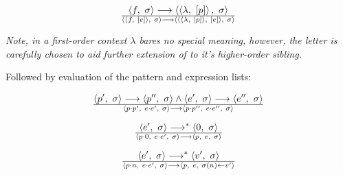 \begin{equation}
{
\left\langle f,\ \sigma\right\rangle
\longrightarrow
\left\langle \left\langle \lambda,\ [p]\right\rangle,\ \sigma\right\rangle
}\over{
\left\langle \left\langle f,\ [e]\right\rangle,\ \sigma\right\rangle
\longrightarrow
\left\langle
\left\langle\left\langle \lambda,\ [p]\right\rangle,\ [e]\right\rangle
,\ \sigma\right\rangle
}
\end{equation}

\emph{Note, in a first-order context $\lambda$ bares no special meaning,
however, the letter is carefully chosen to aid further extension of  to
it's higher-order sibling.}

Followed by evaluation of the pattern and expression lists:

\begin{equation}
{
\left\langle p',\ \sigma\right\rangle
\longrightarrow
\left\langle p'',\ \sigma\right\rangle
\wedge
\left\langle e',\ \sigma\right\rangle
\longrightarrow
\left\langle e'',\ \sigma\right\rangle
}\over{
\left\langle p\cdot p',\ e\cdot e',\ \sigma\right\rangle
\longrightarrow
\left\langle p\cdot p'',\ e\cdot e'',\ \sigma\right\rangle
}
\end{equation}

\begin{equation}
{
\left\langle e',\ \sigma\right\rangle
\longrightarrow^*
\left\langle 0,\ \sigma\right\rangle
}\over{
\left\langle p\cdot 0,\ e\cdot e',\ \sigma\right\rangle
\longrightarrow
\left\langle p,\ e,\ \sigma\right\rangle
}
\end{equation}

\begin{equation}
{
\left\langle e',\ \sigma\right\rangle
\longrightarrow^*
\left\langle v',\ \sigma\right\rangle
}\over{
\left\langle p\cdot n,\ e\cdot e',\ \sigma\right\rangle
\longrightarrow
\left\langle p,\ e,\ \sigma(n)\leftarrow v' \right\rangle
}
\end{equation}




